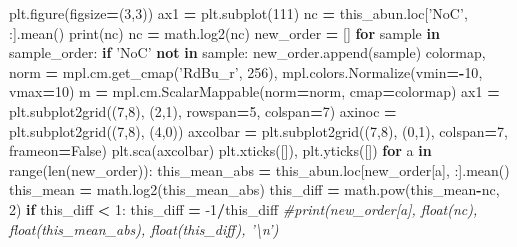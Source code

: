 \documentclass[
]{article}
\newenvironment{Shaded}{\begin{snugshade}}{\end{snugshade}}
\newcommand{\BuiltInTok}[1]{#1}
\newcommand{\CommentTok}[1]{\textcolor[rgb]{0.56,0.35,0.01}{\textit{#1}}}
\newcommand{\ControlFlowTok}[1]{\textcolor[rgb]{0.13,0.29,0.53}{\textbf{#1}}}
\newcommand{\DecValTok}[1]{\textcolor[rgb]{0.00,0.00,0.81}{#1}}
\newcommand{\KeywordTok}[1]{\textcolor[rgb]{0.13,0.29,0.53}{\textbf{#1}}}
\newcommand{\NormalTok}[1]{#1}
\newcommand{\OperatorTok}[1]{\textcolor[rgb]{0.81,0.36,0.00}{\textbf{#1}}}
\newcommand{\StringTok}[1]{\textcolor[rgb]{0.31,0.60,0.02}{#1}}
\newcommand{\VariableTok}[1]{\textcolor[rgb]{0.00,0.00,0.00}{#1}}
\begin{document}
\begin{Shaded}
\begin{Highlighting}[]
\NormalTok{  plt.figure(figsize}\OperatorTok{=}\NormalTok{(}\DecValTok{3}\NormalTok{,}\DecValTok{3}\NormalTok{))}
\NormalTok{  ax1 }\OperatorTok{=}\NormalTok{ plt.subplot(}\DecValTok{111}\NormalTok{)}
\NormalTok{  nc }\OperatorTok{=}\NormalTok{ this_abun.loc[}\StringTok{'NoC'}\NormalTok{, :].mean()}
  \BuiltInTok{print}\NormalTok{(nc)}
\NormalTok{  nc }\OperatorTok{=}\NormalTok{ math.log2(nc)}
\NormalTok{  new_order }\OperatorTok{=}\NormalTok{ []}
  \ControlFlowTok{for}\NormalTok{ sample }\KeywordTok{in}\NormalTok{ sample_order:}
    \ControlFlowTok{if} \StringTok{'NoC'} \KeywordTok{not} \KeywordTok{in}\NormalTok{ sample:}
\NormalTok{      new_order.append(sample)}
\NormalTok{  colormap, norm }\OperatorTok{=}\NormalTok{ mpl.cm.get_cmap(}\StringTok{'RdBu_r'}\NormalTok{, }\DecValTok{256}\NormalTok{), mpl.colors.Normalize(vmin}\OperatorTok{=-}\DecValTok{10}\NormalTok{, vmax}\OperatorTok{=}\DecValTok{10}\NormalTok{)}
\NormalTok{  m }\OperatorTok{=}\NormalTok{ mpl.cm.ScalarMappable(norm}\OperatorTok{=}\NormalTok{norm, cmap}\OperatorTok{=}\NormalTok{colormap)}
\NormalTok{  ax1 }\OperatorTok{=}\NormalTok{ plt.subplot2grid((}\DecValTok{7}\NormalTok{,}\DecValTok{8}\NormalTok{), (}\DecValTok{2}\NormalTok{,}\DecValTok{1}\NormalTok{), rowspan}\OperatorTok{=}\DecValTok{5}\NormalTok{, colspan}\OperatorTok{=}\DecValTok{7}\NormalTok{)}
\NormalTok{  axinoc }\OperatorTok{=}\NormalTok{ plt.subplot2grid((}\DecValTok{7}\NormalTok{,}\DecValTok{8}\NormalTok{), (}\DecValTok{4}\NormalTok{,}\DecValTok{0}\NormalTok{))}
\NormalTok{  axcolbar }\OperatorTok{=}\NormalTok{ plt.subplot2grid((}\DecValTok{7}\NormalTok{,}\DecValTok{8}\NormalTok{), (}\DecValTok{0}\NormalTok{,}\DecValTok{1}\NormalTok{), colspan}\OperatorTok{=}\DecValTok{7}\NormalTok{, frameon}\OperatorTok{=}\VariableTok{False}\NormalTok{)}
\NormalTok{  plt.sca(axcolbar)}
\NormalTok{  plt.xticks([]), plt.yticks([])}
  \ControlFlowTok{for}\NormalTok{ a }\KeywordTok{in} \BuiltInTok{range}\NormalTok{(}\BuiltInTok{len}\NormalTok{(new_order)):}
\NormalTok{    this_mean_abs }\OperatorTok{=}\NormalTok{ this_abun.loc[new_order[a], :].mean()}
\NormalTok{    this_mean }\OperatorTok{=}\NormalTok{ math.log2(this_mean_abs)}
\NormalTok{    this_diff }\OperatorTok{=}\NormalTok{ math.}\BuiltInTok{pow}\NormalTok{(this_mean}\OperatorTok{-}\NormalTok{nc, }\DecValTok{2}\NormalTok{)}
    \ControlFlowTok{if}\NormalTok{ this_diff }\OperatorTok{<} \DecValTok{1}\NormalTok{:}
\NormalTok{      this_diff }\OperatorTok{=} \DecValTok{-1}\OperatorTok{/}\NormalTok{this_diff}
    \CommentTok{#print(new_order[a], float(nc), float(this_mean_abs), float(this_diff), '\textbackslash{}n')}

\end{Highlighting}
\end{Shaded}
\end{document}
